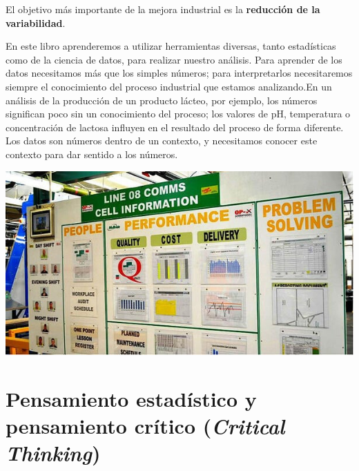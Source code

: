\documentclass[
  letterpaper,
  DIV=11,
  numbers=noendperiod,
  oneside]{scrreprt}
\begin{document}
\begin{tcolorbox}[enhanced jigsaw, colback=white, opacitybacktitle=0.6, leftrule=.75mm, opacityback=0, coltitle=black, colframe=quarto-callout-important-color-frame, colbacktitle=quarto-callout-important-color!10!white, bottomrule=.15mm, title=\textcolor{quarto-callout-important-color}{\faExclamation}\hspace{0.5em}{Importante}, bottomtitle=1mm, toptitle=1mm, breakable, left=2mm, arc=.35mm, titlerule=0mm, rightrule=.15mm, toprule=.15mm]

El objetivo más importante de la mejora industrial es la
\textbf{reducción de la variabilidad}.

\end{tcolorbox}

En este libro aprenderemos a utilizar herramientas diversas, tanto
estadísticas como de la ciencia de datos, para realizar nuestro
análisis. Para aprender de los datos necesitamos más que los simples
números; para interpretarlos necesitaremos siempre el conocimiento del
proceso industrial que estamos analizando.En un análisis de la
producción de un producto lácteo, por ejemplo, los números significan
poco sin un conocimiento del proceso; los valores de pH, temperatura o
concentración de lactosa influyen en el resultado del proceso de forma
diferente. Los datos son números dentro de un contexto, y necesitamos
conocer este contexto para dar sentido a los números.

\begin{marginfigure}

{\centering \includegraphics{01-imagenes/Lean-Visual-Management-Boards-in-Factories-Keep-It-Simple.jpg}

}

\end{marginfigure}

\hypertarget{pensamiento-estaduxedstico-y-pensamiento-cruxedtico-critical-thinking}{%
\section{\texorpdfstring{Pensamiento estadístico y pensamiento crítico
(\emph{Critical
Thinking})}{Pensamiento estadístico y pensamiento crítico (Critical Thinking)}}\label{pensamiento-estaduxedstico-y-pensamiento-cruxedtico-critical-thinking}}
\end{document}

